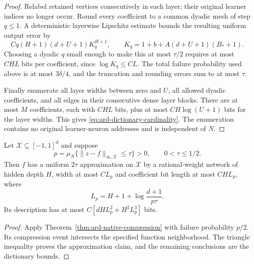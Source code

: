 \begin{proof}
Relabel retained vertices consecutively in each layer; their original learner indices no longer occur. Round every coefficient to a common dyadic mesh of step $q\le1$. A deterministic layerwise Lipschitz estimate bounds the resulting uniform output error by
\[
 Cq(H+1)(d+U+1)K_q^{H+1},
 \qquad K_q=1+b+A(d+U+1)(B_*+1).
\]
Choosing a dyadic $q$ small enough to make this at most $\tau/2$ requires at most $CHL$ bits per coefficient, since $\log K_q\le CL$. The total failure probability used above is at most $3\delta/4$, and the truncation and rounding errors sum to at most $\tau$.

Finally enumerate all layer widths between zero and $U$, all allowed dyadic coefficients, and all edges in their consecutive dense layer blocks. There are at most $M$ coefficients, each with $CHL$ bits, plus at most $CH\log(U+1)$ bits for the layer widths. This gives \eqref{eq:ard-dictionary-cardinality}. The enumeration contains no original learner-neuron addresses and is independent of $N$.
\end{proof}

\begin{corollary}
\label{cor:ard-prior-complexity}
Let $\mathcal X\subseteq[-1,1]^d$ and suppose
\[
 p=\mu_N\{\|z-f\|_{\infty,\mathcal X}\le\tau\}>0,
 \qquad0<\tau\le1/2.
\]
Then $f$ has a uniform $2\tau$ approximation on $\mathcal X$ by a rational-weight network of hidden depth $H$, width at most $CL_p$ and coefficient bit length at most $CHL_p$, where
\[
 L_p=H+1+\log\frac{d+1}{p\tau}.
\]
Its description has at most $C[dH L_p^2+H^2L_p^3]$ bits.
\end{corollary}
\begin{proof}
Apply Theorem~\ref{thm:ard-native-compression} with failure probability $p/2$. Its compression event intersects the specified function neighborhood. The triangle inequality proves the approximation claim, and the remaining conclusions are the dictionary bounds.
\end{proof}
